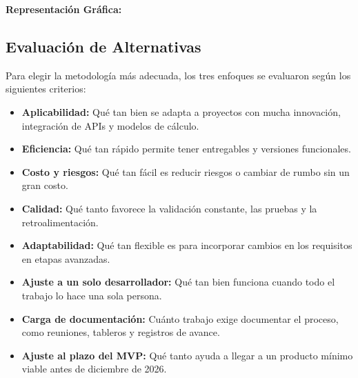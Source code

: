 \textbf{Representación Gráfica:}
\begin{center}
\end{center}
\newpage
\subsection{Evaluación de Alternativas}
Para elegir la metodología más adecuada, los tres enfoques se evaluaron según los siguientes criterios:

\begin{itemize}
    \item \textbf{Aplicabilidad:} Qué tan bien se adapta a proyectos con mucha innovación, integración de APIs y modelos de cálculo.
    \item \textbf{Eficiencia:} Qué tan rápido permite tener entregables y versiones funcionales.
    \item \textbf{Costo y riesgos:} Qué tan fácil es reducir riesgos o cambiar de rumbo sin un gran costo.
    \item \textbf{Calidad:} Qué tanto favorece la validación constante, las pruebas y la retroalimentación.
    \item \textbf{Adaptabilidad:} Qué tan flexible es para incorporar cambios en los requisitos en etapas avanzadas.
    \item \textbf{Ajuste a un solo desarrollador:} Qué tan bien funciona cuando todo el trabajo lo hace una sola persona.
    \item \textbf{Carga de documentación:} Cuánto trabajo exige documentar el proceso, como reuniones, tableros y registros de avance.
    \item \textbf{Ajuste al plazo del MVP:} Qué tanto ayuda a llegar a un producto mínimo viable antes de diciembre de 2026.
\end{itemize}
\newpage
